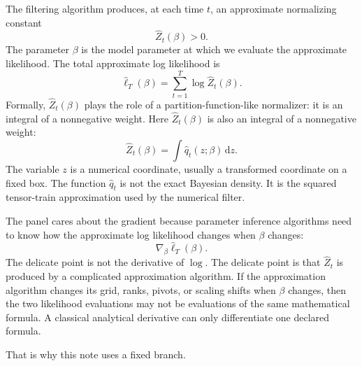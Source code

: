 \documentclass[11pt]{article}
\numberwithin{equation}{section}
\newcommand{\dd}{\,\mathrm d}
\newcommand{\widehatell}{\widehat\ell}
\begin{document}
The filtering algorithm produces, at each time \(t\), an approximate
normalizing constant
\begin{equation}
    \widehat Z_t(\beta)>0.
    \label{eq:p24-p19-1}
\end{equation}
The parameter \(\beta\) is the model parameter at which we evaluate the
approximate likelihood.  The total approximate log likelihood is
\begin{equation}
    \widehatell_T(\beta)
    =
    \sum_{t=1}^{T}\log \widehat Z_t(\beta).
    \label{eq:p24-p19-2}
\end{equation}
Formally, \(\widehat Z_t(\beta)\) plays the role of a
partition-function-like normalizer: it is an integral of a nonnegative weight.
Here
\(\widehat Z_t(\beta)\) is also an integral of a nonnegative weight:
\begin{equation}
    \widehat Z_t(\beta)
    =
    \int \widehat q_t(z;\beta)\dd z.
    \label{eq:p24-p19-3}
\end{equation}
The variable \(z\) is a numerical coordinate, usually a transformed coordinate
on a fixed box.  The function \(\widehat q_t\) is not the exact Bayesian
density.  It is the squared tensor-train approximation used by the numerical
filter.

The panel cares about the gradient because parameter inference algorithms need
to know how the approximate log likelihood changes when \(\beta\) changes:
\begin{equation}
    \nabla_\beta \widehatell_T(\beta).
    \label{eq:p24-p19-4}
\end{equation}
The delicate point is not the derivative of \(\log\).  The delicate point is
that \(\widehat Z_t\) is produced by a complicated approximation algorithm.  If
the approximation algorithm changes its grid, ranks, pivots, or scaling shifts
when \(\beta\) changes, then the two likelihood evaluations may not be
evaluations of the same mathematical formula.  A classical analytical
derivative can only differentiate one declared formula.

That is why this note uses a fixed branch.

\begin{center}
\end{center}
\end{document}
